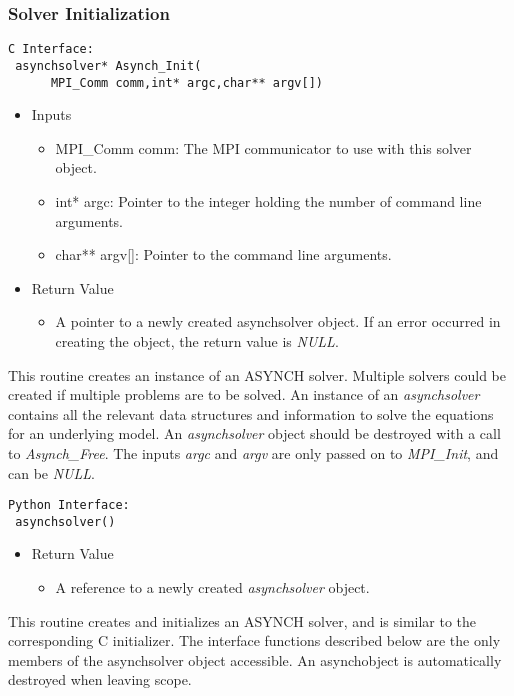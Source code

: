 \documentclass[12pt]{article}
\begin{document}
\subsubsection{Solver Initialization} \label{sec: solver initialization}

\begin{lstlisting}[style=CStyle]
 C Interface:
 asynchsolver* Asynch_Init(
	  MPI_Comm comm,int* argc,char** argv[])
\end{lstlisting}
\begin{itemize}
 \item Inputs
  \begin{itemize}
   \item MPI\_Comm comm: The MPI communicator to use with this solver object.
   \item int* argc: Pointer to the integer holding the number of command line arguments.
   \item char** argv[]: Pointer to the command line arguments.
  \end{itemize}
 \item Return Value
  \begin{itemize}
   \item A pointer to a newly created asynchsolver object. If an error occurred in creating the object, the return value is \emph{NULL}.
  \end{itemize}
\end{itemize}
This routine creates an instance of an ASYNCH solver. Multiple solvers could be created if multiple problems are to be solved. An instance of an \emph{asynchsolver} contains all the relevant data structures and information to solve the equations for an underlying model. An \emph{asynchsolver} object should be destroyed with a call to \emph{Asynch\_Free}. The inputs \emph{argc} and \emph{argv} are only passed on to \emph{MPI\_Init}, and can be \emph{NULL}.

\begin{lstlisting}[style=PythonStyle]
 Python Interface:
 asynchsolver()
\end{lstlisting}
\begin{itemize}
 \item Return Value
  \begin{itemize}
   \item A reference to a newly created \emph{asynchsolver} object.
  \end{itemize}
\end{itemize}
This routine creates and initializes an ASYNCH solver, and is similar to the corresponding C initializer. The interface functions described below are the only members of the asynchsolver object accessible. An asynchobject is automatically destroyed when leaving scope.
\end{document}
